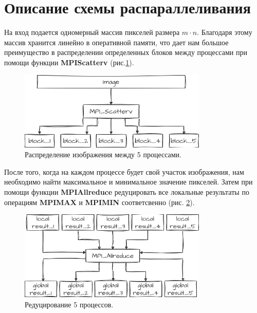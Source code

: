 \documentclass[a4paper,12pt]{article}
\begin{document}
\section*{Описание схемы распараллеливания}

На вход подается одномерный массив пикселей размера $m\cdot n$. Благодаря этому массив хранится линейно в оперативной памяти, что дает нам большое преимущество в распределении определенных блоков между процессами при помощи функции \textbf{MPI\textunderscore Scatterv} (рис.\ref{fig:distrImage}).

\vspace{5mm}

\begin{figure}[h!]
\centering
\includegraphics[width=0.8\textwidth]{images/distrImage.png}
\caption{Распределение изображения между 5 процессами.}
\label{fig:distrImage}
\end{figure}

\vspace{5mm}

После того, когда на каждом процессе будет свой участок изображения, нам необходимо найти максимальное и минимальное значение пикселей. Затем при помощи функции \textbf{MPI\textunderscore Allreduce} редуцировать все локальные результаты по операциям \textbf{MPI\textunderscore MAX} и \textbf{MPI\textunderscore MIN} соответсвенно (рис. \ref{fig:allreduce}).

\vspace{5mm}

\begin{figure}[h!]
\centering
\includegraphics[width=0.8\textwidth]{images/MPI_Allreduce.png}
\caption{Редуцирование 5 процессов.}
\label{fig:allreduce}
\end{figure}
\end{document}

